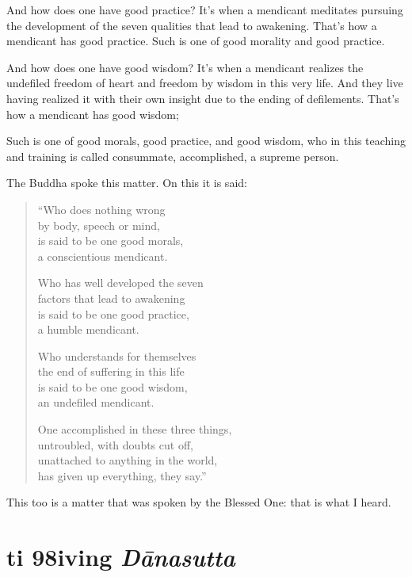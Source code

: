 \documentclass[12pt,openany]{book}%
\newcommand*{\suttatitleacronym}[1]{\smaller[2]{#1}\vspace*{.3em}}
\newcommand*{\suttatitletranslation}[1]{\linebreak{#1}}
\newcommand*{\suttatitleroot}[1]{\linebreak\smaller[2]\itshape{#1}}
\newcommand*{\tocacronym}[1]{\hspace*{-3.3em}{#1}\quad}
\newcommand*{\toctranslation}[1]{#1}
\newcommand*{\tocroot}[1]{(\textit{#1})}
\begin{document}
And how does one have good practice? It’s when a mendicant meditates pursuing the development of the seven qualities that lead to awakening. That’s how a mendicant has good practice. Such is one of good morality and good practice. 

And how does one have good wisdom? It’s when a mendicant realizes the undefiled freedom of heart and freedom by wisdom in this very life. And they live having realized it with their own insight due to the ending of defilements. That’s how a mendicant has good wisdom; 

Such is one of good morals, good practice, and good wisdom, who in this teaching and training is called consummate, accomplished, a supreme person. 

The Buddha spoke this matter. On this it is said: 

\begin{verse}%
“Who does nothing wrong \\
by body, speech or mind, \\
is said to be one good morals, \\
a conscientious mendicant. 

Who has well developed the seven \\
factors that lead to awakening \\
is said to be one good practice, \\
a humble mendicant. 

Who understands for themselves \\
the end of suffering in this life \\
is said to be one good wisdom, \\
an undefiled mendicant. 

One accomplished in these three things, \\
untroubled, with doubts cut off, \\
unattached to anything in the world, \\
has given up everything, they say.” 

%
\end{verse}

This too is a matter that was spoken by the Blessed One: that is what I heard. 

%
\section*{{\suttatitleacronym Iti 98}{\suttatitletranslation Giving }{\suttatitleroot Dānasutta}}
\addcontentsline{toc}{section}{\tocacronym{Iti 98} \toctranslation{Giving } \tocroot{Dānasutta}}
\end{document}
